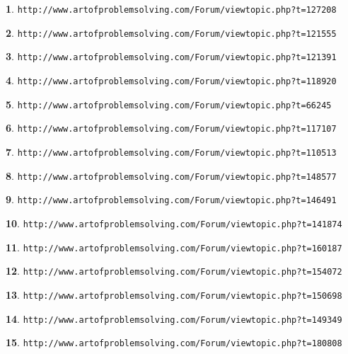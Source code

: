 \documentclass{article}
\theoremstyle{definition}
\newtheorem{s}{}
\begin{document}
	
	
	\begin{s}
		\texttt{http://www.artofproblemsolving.com/Forum/viewtopic.php?t=127208}
	\end{s}
	
	\begin{s}
		\texttt{http://www.artofproblemsolving.com/Forum/viewtopic.php?t=121555}
	\end{s}
	
	\begin{s}
		\texttt{http://www.artofproblemsolving.com/Forum/viewtopic.php?t=121391}
	\end{s}
	
	\begin{s}
		\texttt{http://www.artofproblemsolving.com/Forum/viewtopic.php?t=118920}
	\end{s}
	
	\begin{s}
		\texttt{http://www.artofproblemsolving.com/Forum/viewtopic.php?t=66245}
	\end{s}
	
	\begin{s}
		\texttt{http://www.artofproblemsolving.com/Forum/viewtopic.php?t=117107}
	\end{s}
	
	\begin{s}
		\texttt{http://www.artofproblemsolving.com/Forum/viewtopic.php?t=110513}
	\end{s}
	
	\begin{s}
		\texttt{http://www.artofproblemsolving.com/Forum/viewtopic.php?t=148577}
	\end{s}
	
	\begin{s}
		\texttt{http://www.artofproblemsolving.com/Forum/viewtopic.php?t=146491}
	\end{s}
	
	\begin{s}
		\texttt{http://www.artofproblemsolving.com/Forum/viewtopic.php?t=141874}
	\end{s}
	
	\begin{s}
		\texttt{http://www.artofproblemsolving.com/Forum/viewtopic.php?t=160187}
	\end{s}
	
	\begin{s}
		\texttt{http://www.artofproblemsolving.com/Forum/viewtopic.php?t=154072}
	\end{s}
	
	\begin{s}
		\texttt{http://www.artofproblemsolving.com/Forum/viewtopic.php?t=150698}
	\end{s}
	
	\begin{s}
		\texttt{http://www.artofproblemsolving.com/Forum/viewtopic.php?t=149349}
	\end{s}
	
	\begin{s}
		\texttt{http://www.artofproblemsolving.com/Forum/viewtopic.php?t=180808}
	\end{s}
	
	
	
	
\end{document}
